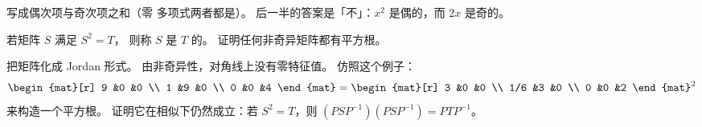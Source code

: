 \begin{exercises}
\begin{answer}
      写成偶次项与奇次项之和（零
      多项式两者都是）。
      后一半的答案是「不」：\( x^2 \) 是偶的，而
      \( 2x \) 是奇的。  
     \end{answer}
   \item 
     若矩阵 \( S \) 满足 \( S^2=T \)，
     则称 \( S \) 是 \( T \) 的。
     证明任何非奇异矩阵都有平方根。
     \begin{answer}
         把矩阵化成 Jordan 形式。
         由非奇异性，对角线上没有零特征值。
         仿照这个例子：
          \begin{equation*}
             \begin{mat}[r]
                9  &0  &0 \\
                1  &9  &0 \\
                0  &0  &4
             \end{mat}
             =
             \begin{mat}[r]
                3  &0  &0 \\
               1/6 &3  &0 \\
                0  &0  &2
             \end{mat}^2
          \end{equation*}
         来构造一个平方根。
         证明它在相似下仍然成立：若 \( S^2=T \)，则
         \( (PSP^{-1})(PSP^{-1})=PTP^{-1} \)。 
    \end{answer}
\end{exercises}
